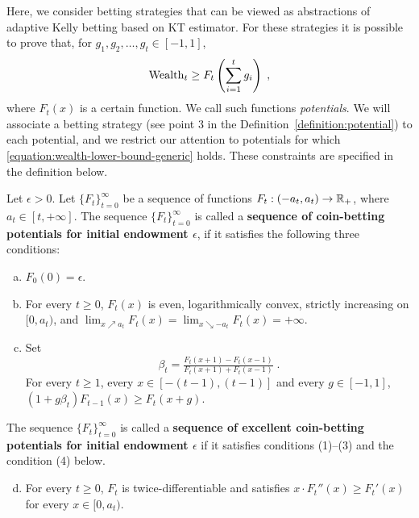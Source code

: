 Here, we consider betting strategies that can be viewed as abstractions of
adaptive Kelly betting based on KT estimator. For these strategies it is
possible to prove that, for $g_1, g_2, \dots, g_t \in [-1,1]$,
\begin{equation}
\label{equation:wealth-lower-bound-generic}
\operatorname{Wealth}_t \ge F_t \left( \sum_{i=1}^t g_i \right) \; ,
\end{equation}
where $F_t(x)$ is a certain function. We call such functions \emph{potentials}.
We will associate a betting strategy (see point 3 in the Definition~\ref{definition:potential}) to each potential,
and we restrict our
attention to potentials for which \eqref{equation:wealth-lower-bound-generic}
holds. These constraints are specified in the definition below.
\begin{definition}
\label{definition:potential}
Let $\epsilon > 0$. Let $\{F_t\}_{t=0}^\infty$ be a sequence of functions
$F_t:(-a_t, a_t)  \to \mathbb{R}_+$, where $a_t \in [t, +\infty]$.  The sequence
$\{F_t\}_{t=0}^\infty$ is called a \textbf{sequence of coin-betting potentials
for initial endowment $\epsilon$}, if it satisfies the following three
conditions:
\begin{enumerate}[(a)]
\item $F_0(0) = \epsilon$.

\item For every $t \ge 0$, $F_t(x)$ is even, logarithmically convex, strictly
increasing on $[0,a_t)$, and
$\lim_{x \nearrow a_t} F_t(x) = \lim_{x \searrow -a_t} F_t(x) = +\infty$.
\item Set 
\begin{equation}
\label{equation:potential-based-strategy}
\beta_t=\tfrac{F_t(x + 1) - F_t(x - 1)}{F_t(x + 1) + F_t(x - 1)} \;.
\end{equation}
For every $t \ge 1$, every $x \in [-(t-1), (t-1)]$ and every $g \in [-1,1]$, $\left(1 + g \beta_t \right) F_{t-1}(x) \ge F_t(x+g)$.
\end{enumerate}
The sequence $\{F_t\}_{t=0}^\infty$ is called a
\textbf{sequence of excellent coin-betting potentials for initial
endowment $\epsilon$} if it satisfies conditions (1)--(3) and the condition (4)
below.
\begin{enumerate}[(a)]
\setcounter{enumi}{3}
\item For every $t \ge 0$, $F_t$ is twice-differentiable and
satisfies $x \cdot F_t''(x) \ge F_t'(x)$ for every $x \in [0,a_t)$.
\end{enumerate}
\end{definition}


